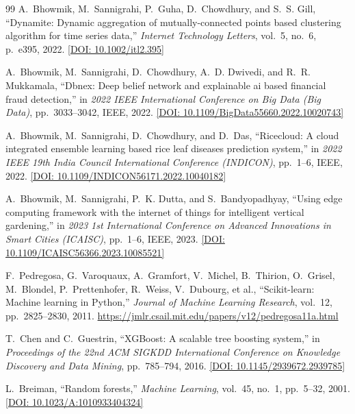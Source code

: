 \documentclass[12pt,a4paper,oneside]{report}
\begin{document}
\begin{thebibliography}{99}
A.~Bhowmik, M.~Sannigrahi, P.~Guha, D.~Chowdhury, and S.~S. Gill,
\newblock ``Dynamite: Dynamic aggregation of mutually-connected points based clustering algorithm for time series data,''
\newblock \emph{Internet Technology Letters}, vol.~5, no.~6, p.~e395, 2022. \href{https://doi.org/10.1002/itl2.395}{[DOI: 10.1002/itl2.395]}

A.~Bhowmik, M.~Sannigrahi, D.~Chowdhury, A.~D. Dwivedi, and R.~R. Mukkamala,
\newblock ``Dbnex: Deep belief network and explainable ai based financial fraud detection,''
\newblock in \emph{2022 IEEE International Conference on Big Data (Big Data)}, pp.~3033--3042, IEEE, 2022. \href{https://doi.org/10.1109/BigData55660.2022.10020743}{[DOI: 10.1109/BigData55660.2022.10020743]}

A.~Bhowmik, M.~Sannigrahi, D.~Chowdhury, and D.~Das,
\newblock ``Ricecloud: A cloud integrated ensemble learning based rice leaf diseases prediction system,''
\newblock in \emph{2022 IEEE 19th India Council International Conference (INDICON)}, pp.~1--6, IEEE, 2022. \href{https://doi.org/10.1109/INDICON56171.2022.10040182}{[DOI: 10.1109/INDICON56171.2022.10040182]}

A.~Bhowmik, M.~Sannigrahi, P.~K. Dutta, and S.~Bandyopadhyay,
\newblock ``Using edge computing framework with the internet of things for intelligent vertical gardening,''
\newblock in \emph{2023 1st International Conference on Advanced Innovations in Smart Cities (ICAISC)}, pp.~1--6, IEEE, 2023. \href{https://doi.org/10.1109/ICAISC56366.2023.10085521}{[DOI: 10.1109/ICAISC56366.2023.10085521]}

F.~Pedregosa, G.~Varoquaux, A.~Gramfort, V.~Michel, B.~Thirion, O.~Grisel, M.~Blondel, P.~Prettenhofer, R.~Weiss, V.~Dubourg, et al.,
\newblock ``Scikit-learn: Machine learning in Python,''
\newblock \emph{Journal of Machine Learning Research}, vol.~12, pp.~2825--2830, 2011. \url{https://jmlr.csail.mit.edu/papers/v12/pedregosa11a.html}

T.~Chen and C.~Guestrin,
\newblock ``XGBoost: A scalable tree boosting system,''
\newblock in \emph{Proceedings of the 22nd ACM SIGKDD International Conference on Knowledge Discovery and Data Mining}, pp.~785--794, 2016. \href{https://doi.org/10.1145/2939672.2939785}{[DOI: 10.1145/2939672.2939785]}

L.~Breiman,
\newblock ``Random forests,''
\newblock \emph{Machine Learning}, vol.~45, no.~1, pp.~5--32, 2001. \href{https://doi.org/10.1023/A:1010933404324}{[DOI: 10.1023/A:1010933404324]}


\end{thebibliography}
\end{document}
